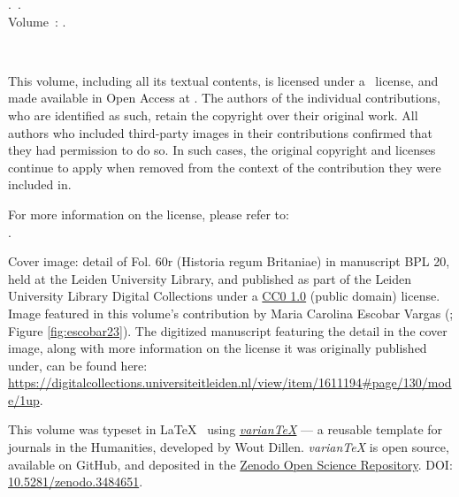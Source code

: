 \null\vfill\small
\noindent\thejournal.~\thejournalsubtitle. \\ 
\noindent Volume~\thevolume: \thevolumetitle. \\ \par
\noindent\doclicenseIcon \ \theyear \\ \par 
\noindent This volume, including all its textual contents, is licensed under a \doclicenseLongNameRef \ license, and made available in Open Access at \href{\thewebsite}{\thewebsite}. The authors of the individual contributions, who are identified as such, retain the copyright over their original work.  All authors who included third-party images in their contributions confirmed that they had permission to do so. In such cases, the original copyright and licenses continue to apply when removed from the context of the contribution they were included in. \\ \par
\noindent For more information on the \doclicenseNameRef license, please refer to: \\ \doclicenseURL.  \\ \par

\noindent Cover image: detail of Fol. 60r (Historia regum Britaniae) in manuscript BPL 20, held at the Leiden University Library, and published as part of the Leiden University Library Digital Collections under a \href{https://creativecommons.org/publicdomain/zero/1.0/deed.en}{CC0 1.0} (public domain) license. Image featured in this volume's contribution by Maria Carolina Escobar Vargas (\pageref{fig:escobar23}; Figure \ref{fig:escobar23}). The digitized manuscript featuring the detail in the cover image, along with more information on the license it was originally published under, can be found here: \url{https://digitalcollections.universiteitleiden.nl/view/item/1611194#page/130/mode/1up}. \\ \par

\noindent This volume was typeset in \LaTeX~ using \emph{\href{https://variantex.woutdillen.be}{varianTeX}} --- a reusable template for journals in the Humanities, developed by Wout Dillen. \emph{varianTeX} is open source, available on GitHub, and deposited in the \href{https://about.zenodo.org}{Zenodo Open Science Repository}. DOI: \href{https://zenodo.org/record/3484651#.X0PdDy2w3kI}{10.5281/zenodo.3484651}.  
\newpage